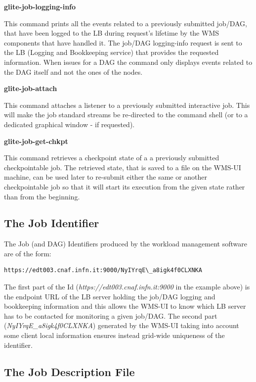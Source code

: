 \textbf{glite-job-logging-info}

This command prints all the events related to a previously submitted job/DAG, that have been logged to the LB during 
request's lifetime by the WMS components that have handled it. The job/DAG logging-info request is sent
to the LB (Logging and Bookkeeping service) that provides the requested information. When issues for a DAG the 
command only displays events related to the DAG itself and not the ones of the nodes. 

\textbf{glite-job-attach}

This command attaches a listener to a previously submitted interactive job. This will make the job standard streams 
be re-directed to the command shell (or to a dedicated graphical window - if requested).

\textbf{glite-job-get-chkpt}

This command retrieves a checkpoint state of a a previously submitted checkpointable job. The retrieved state, that
is saved to a file on the WMS-UI machine, can be used later to re-submit either the same or another checkpointable 
job so that it will start its execution from the given state rather than from the beginning.

\smallskip
\subsection{The Job Identifier}

The Job (and DAG) Identifiers produced by the workload management software are of the form:

\smallskip
\begin{verbatim}
https://edt003.cnaf.infn.it:9000/NyIYrqE\_a8igk4f0CLXNKA
\end{verbatim}
\smallskip

The first part of the Id (\emph{https://edt003.cnaf.infn.it:9000} in the example above) is the endpoint URL of the 
LB server holding the job/DAG logging and bookkeeping information and this allows the WMS-UI to know which LB server has 
to be contacted for monitoring a given job/DAG. 
\smallskip
The second part (\emph{NyIYrqE\_a8igk4f0CLXNKA})  generated by the WMS-UI taking into account some client local information 
ensures instead grid-wide uniqueness of the identifier. 

    
\subsection{The Job Description File}


